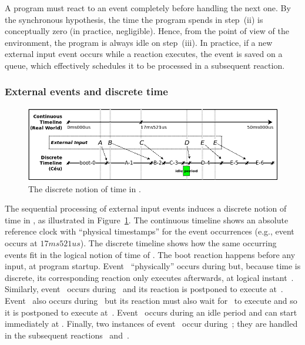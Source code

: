 A program must react to an event completely before handling the next one.
%
By the synchronous hypothesis, the time the program spends in step~(ii) is
conceptually zero (in practice, negligible).
%
Hence, from the point of view of the environment, the program is always
idle on step~(iii).
%
In practice, if a new external input event occurs while a reaction executes,
the event is saved on a queue, which effectively schedules it to be processed
in a subsequent reaction.

\subsubsection*{External events and discrete time}

\begin{figure}[b]
\centering
\includegraphics[width=\columnwidth]{tick}
\caption{The discrete notion of time in \CEU.}
\label{fig.ticks}
\end{figure}

The sequential processing of external input events induces a discrete notion of
time in \CEU, as illustrated in Figure~\ref{fig.ticks}.
%
The continuous timeline shows an absolute reference clock with ``physical
timestamps'' for the event occurrences (e.g., event~ occurs at
$17ms521us$).
%
The discrete timeline shows how the same occurring events fit in the logical
notion of time of \CEU.
%
The boot reaction  happens before any input, at program startup.
%
Event~ ``physically'' occurs during  but, because time
is discrete, its corresponding reaction only executes afterwards, at logical
instant~.
%
Similarly, event~ occurs during~ and its reaction is
postponed to execute at~.
%
Event~ also occurs during~ but its reaction must also wait
for~ to execute and so it is postponed to execute at~.
%
Event~ occurs during an idle period and can start immediately at
.
%
Finally, two instances of event~ occur during~; they are
handled in the subsequent reactions~ and~.

